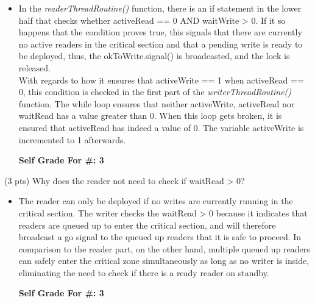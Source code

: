 \documentclass[conference]{IEEEtran}
\begin{document}
\begin{itemize}
\begin{itemize}
	\item In the \textit{readerThreadRoutine()} function, there is an if statement in the lower half that checks whether activeRead == 0 AND waitWrite > 0. If it so happens that the condition proves true, this signals that there are currently no active readers in the critical section and that a pending write is ready to be deployed, thus, the okToWrite.signal() is broadcasted, and the lock is released. \\
	With regards to how it ensures that activeWrite == 1 when activeRead == 0, this condition is checked in the first part of the \textit{writerThreadRoutine()} function. The while loop ensures that neither activeWrite, activeRead nor waitRead has a value greater than 0. When this loop gets broken, it is ensured that activeRead has indeed a value of 0. The variable activeWrite is incremented to 1 afterwards.
	\begin{center}
		\textbf{Self Grade For \#: 3}
	\end{center}
\end{itemize}

(3 pts) Why does the reader not need to check if waitRead > 0?

\begin{itemize}
	\item The reader can only be deployed if no writes are currently running in the critical section. The writer checks the waitRead > 0 because it indicates that readers are queued up to enter the critical section, and will therefore broadcast a go signal to the queued up readers that it is safe to proceed. In comparison to the reader part, on the other hand, multiple queued up readers can safely enter the critical zone simultaneously as long as no writer is inside, eliminating the need to check if there is a ready reader on standby.
	\begin{center}
		\textbf{Self Grade For \#: 3}
	\end{center}
\end{itemize}

\end{itemize}
\end{document}
